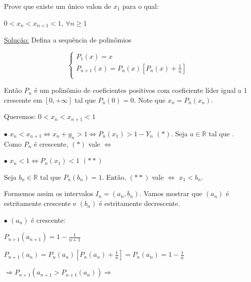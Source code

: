 \documentclass[a4paper,12pt]{article}
\renewcommand{\geq}{\ensuremath{\geqslant}}
\theoremstyle{plain} %
\theoremstyle{definition} %
\theoremstyle{remark} %
\begin{document}
	Prove que existe um \'unico valon de $x_1$ para o qual:
	
	\begin{center}
		$0<x_n<x_{n+1}<1$, $\forall n\geq 1$
	\end{center}
	
	\begin{framed}
		\underline{Solu\c{c}\~ao:} Defina a sequ\^encia de polin\^omios
		
		\vspace{-4ex}
		\begin{equation*}
			\begin{cases}
				P_1(x) = x \\
				P_{n+1}(x) = P_n(x)\left[P_n(x)+\frac{1}{n}\right]\\
			\end{cases}
		\end{equation*} 
		
		
		Ent\~ao $P_n$ \'e um polin\^omio de coeficientes positivos com coeficiente líder igual a 1 crescente em $[0, +\infty]$ tal que $P_n(0)=0$. Note que $x_n=P_n(x_n)$.
		
		Queremos: $0<x_n<x_{n+1}<1$
		
		$\bullet$ \hspace{1em}$x_n<x_{n+1}\Leftrightarrow x_n+y_n>1\Leftrightarrow P_n(x_1)>1-Y_n$ $(\ast)$. Seja $a\in\mathds{R}$ tal que . Como $P_n$ \'e crescente, $(\ast)$ vale $\Leftrightarrow$ 
		
		$\bullet$ \hspace{1em} $x_n<1\Leftrightarrow P_n(x_1)<1$ $(\ast\ast)$
		
		Seja $b_n\in \mathds{R}$ tal que $P_n(b_n)=1$. Ent\~ao, $(\ast\ast)$ vale $\Leftrightarrow$ $x_1<b_n$.
		
		Formemos assim os intervalos $I_n=(a_n, b_n)$. Vamos mostrar que $(a_n)$ \'e estritamente crescente e $(b_n)$ \'e estritamente decrescente.
		
		$\bullet$ \hspace{1em} $(a_n)$ \'e crescente:
		
		\begin{center}
			$P_{n+1}(a_{n+1})=1-\frac{1}{n+1}$
		\end{center}
		
		$P_{n+1}(a_{n})=P_{n}(a_{n})[P_n(a_n)+\frac{1}{n}]=P_{n}(a_{n})=1-\frac{1}{n}$
		
		$\Rightarrow P_{n+1}(a_{n+1}>P_{n+1}(a_{n}))\Rightarrow$ 
		

\end{framed}
\end{document}

